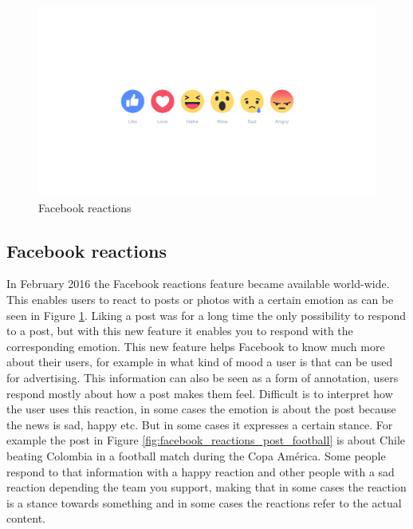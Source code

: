 \documentclass[11pt]{article}
\begin{document}
\begin{figure}[hbt]
  \includegraphics[width=\linewidth]{reactions-image-en_us.png}
  \caption{Facebook reactions}
  \label{fig:facebook_reactions}
\end{figure}

\subsection{Facebook reactions}
In February 2016 the Facebook reactions feature became available world-wide. This enables users to react to posts or photos with a certain emotion as can be seen in Figure \ref{fig:facebook_reactions}. Liking a post was for a long time the only possibility to respond to a post, but with this new feature it enables you to respond with the corresponding emotion. This new feature helps Facebook to know much more about their users, for example in what kind of mood a user is that can be used for advertising. \cite{wired} This information can also be seen as a form of annotation, users respond mostly about how a post makes them feel. Difficult is to interpret how the user uses this reaction, in some cases the emotion is about the post because the news is sad, happy etc. But in some cases it expresses a certain stance. For example the post in Figure \ref{fig:facebook_reactions_post_football} is about Chile beating Colombia in a football match during the Copa América. Some people respond to that information with a happy reaction and other people with a sad reaction depending the team you support, making that in some cases the reaction is a stance towards something and in some cases the reactions refer to the actual content.
\end{document}

